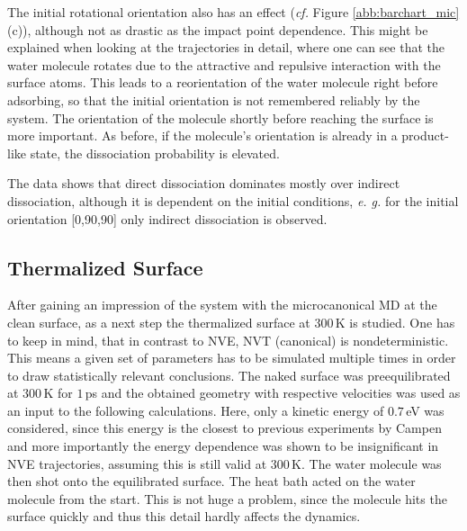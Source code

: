 \documentclass[11pt,DIV=13,BCOR=5mm,a4paper,headinclude]{scrbook}
\begin{document}
The initial rotational orientation also has an effect (\textit{cf.} Figure \ref{abb:barchart_mic}(c)), although not as drastic as the impact point dependence.
This might be explained when looking at the trajectories in detail, where one can see that the water molecule rotates due to the attractive and repulsive interaction with the surface atoms.
This leads to a reorientation of the water molecule right before adsorbing, so that the initial orientation is not remembered reliably by the system.
The orientation of the molecule shortly before reaching the surface is more important.
As before, if the molecule's orientation is already in a product-like state, the dissociation probability is elevated.


The data shows that direct dissociation dominates mostly over indirect dissociation, although it is dependent on the initial conditions, \textit{e.
g.} for the initial orientation [0,90,90] only indirect dissociation is observed.

 \clearpage
\subsection{Thermalized Surface}\label{therm_surf}
After gaining an impression of the system with the microcanonical MD at the clean surface, as a next step the thermalized surface at $300\,$K is studied.
One has to keep in mind, that in contrast to NVE, NVT (canonical) is nondeterministic.
This means a given set of parameters has to be simulated multiple times in order to draw statistically relevant conclusions.
The naked surface was preequilibrated at $300\,$K for $1\,$ps and the obtained geometry with respective velocities was used as an input to the following calculations.
Here, only a kinetic energy of $0.7\,$eV was considered, since this energy is the closest to previous experiments by Campen and more importantly the energy dependence was shown to be insignificant in NVE trajectories, assuming this is still valid at $300\,$K.
The water molecule was then shot onto the equilibrated surface.
The heat bath acted on the water molecule from the start.
This is not huge a problem, since the molecule hits the surface quickly and thus this detail hardly affects the dynamics.
\end{document}
